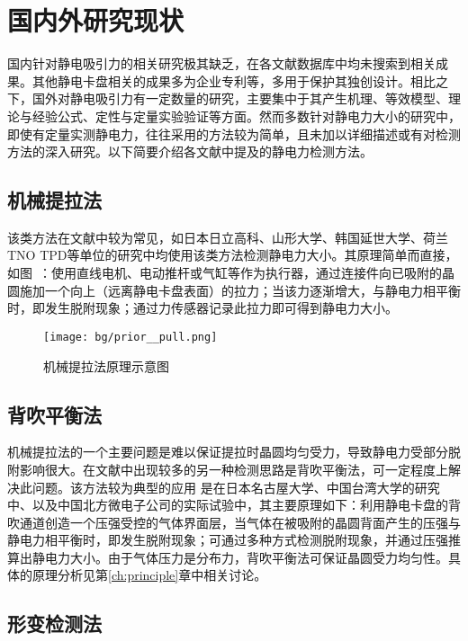 \section{国内外研究现状}\label{sec:bg-prior}

国内针对静电吸引力的相关研究极其缺乏，在各文献数据库中均未搜索到相关成果。其他静电卡盘相关的成果多为企业专利等，多用于保护其独创设计。相比之下，国外对静电吸引力有一定数量的研究，主要集中于其产生机理、等效模型、理论与经验公式、定性与定量实验验证等方面。然而多数针对静电力大小的研究中，即使有定量实测静电力，往往采用的方法较为简单，且未加以详细描述或有对检测方法的深入研究。以下简要介绍各文献中提及的静电力检测方法。


\subsection{机械提拉法}\label{sec:bg-prior--pull}

该类方法在文献中较为常见，如日本日立高科、山形大学、韩国延世大学、荷兰TNO TPD等单位的研究中均使用该类方法检测静电力大小。其原理简单而直接，如图~：使用直线电机、电动推杆或气缸等作为执行器，通过连接件向已吸附的晶圆施加一个向上（远离静电卡盘表面）的拉力；当该力逐渐增大，与静电力相平衡时，即发生脱附现象；通过力传感器记录此拉力即可得到静电力大小。

\begin{figure}[tbh]
\centering
\texttt{[image: bg/prior\_\_pull.png]}
\caption{机械提拉法原理示意图}
\label{fig:bg-prior-pull}
\end{figure}


\subsection{背吹平衡法}\label{sec:bg-prior-pressure}

机械提拉法的一个主要问题是难以保证提拉时晶圆均匀受力，导致静电力受部分脱附影响很大。在文献中出现较多的另一种检测思路是背吹平衡法，可一定程度上解决此问题。该方法较为典型的应用 是在日本名古屋大学、中国台湾大学的研究中、以及中国北方微电子公司的实际试验中，其主要原理如下：利用静电卡盘的背吹通道创造一个压强受控的气体界面层，当气体在被吸附的晶圆背面产生的压强与静电力相平衡时，即发生脱附现象；可通过多种方式检测脱附现象，并通过压强推算出静电力大小。由于气体压力是分布力，背吹平衡法可保证晶圆受力均匀性。具体的原理分析见第\ref{ch:principle}章中相关讨论。


\subsection{形变检测法}\label{sec:bg-prior-warp}

